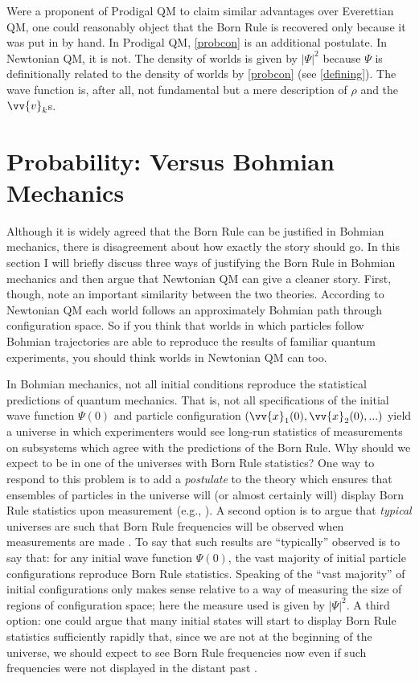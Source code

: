 \documentclass[12pt,secnumarabic,balancelastpage,amsmath,amssymb,nofootinbib]{article}
\begin{document}
Were a proponent of Prodigal QM to claim similar advantages over Everettian QM, one could reasonably object that the Born Rule is recovered only because it was put in by hand.  In Prodigal QM, \eqref{probcon} is an additional postulate.  In Newtonian QM, it is not.  The density of worlds is given by $|\Psi|^2$ because $\Psi$ is definitionally related to the density of worlds by \eqref{probcon}  (see \textsection \ref{defining}).  The wave function is, after all, not fundamental but a mere description of $\rho$ and the $\vv{v}_k$s.

\section{Probability: Versus Bohmian Mechanics}\label{probBOHM}

Although it is widely agreed that the Born Rule can be justified in Bohmian mechanics, there is disagreement about how exactly the story should go.  In this section I will briefly discuss three ways of justifying the Born Rule in Bohmian mechanics and then argue that Newtonian QM can give a cleaner story.  First, though, note an important similarity between the two theories.  According to Newtonian QM each world follows an approximately Bohmian path through configuration space.  So if you think that worlds in which particles follow Bohmian trajectories are able to reproduce the results of familiar quantum experiments, you should think worlds in Newtonian QM can too.

In Bohmian mechanics, not all initial conditions reproduce the statistical predictions of quantum mechanics.  That is, not all specifications of the initial wave function $\Psi(0)$ and particle configuration $(\vv{x}_1(0), \vv{x}_2(0), ...)$ yield a universe in which experimenters would see long-run statistics of measurements on subsystems which agree with the predictions of the Born Rule.  Why should we expect to be in one of the universes with Born Rule statistics?  One way to respond to this problem is to add a \emph{postulate} to the theory which ensures that ensembles of particles in the universe will (or almost certainly will) display Born Rule statistics upon measurement (e.g., \citealp[][.3]{holland}).  A second option is to argue that \emph{typical} universes are such that Born Rule frequencies will be observed when measurements are made \citep{durr1992}.  To say that such results are ``typically'' observed is to say that: for any initial wave function $\Psi(0)$, the vast majority of initial particle configurations reproduce Born Rule statistics.  Speaking of the ``vast majority'' of initial configurations only makes sense relative to a way of measuring the size of regions of configuration space; here the measure used is given by $|\Psi|^2$.  A third option: one could argue that many initial states will start to display Born Rule statistics sufficiently rapidly that, since we are not at the beginning of the universe, we should expect to see Born Rule frequencies now even if such frequencies were not displayed in the distant past \citep{valentini2005}.
\end{document}
